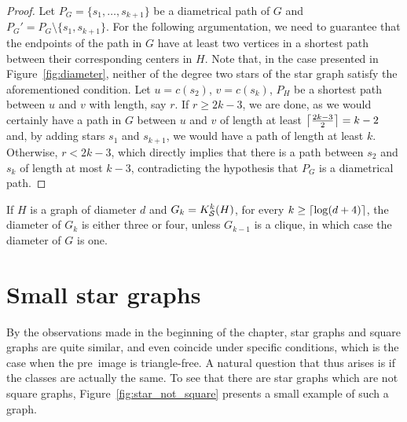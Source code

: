 \begin{proof}
    Let $P_G = \{s_1, \dots, s_{k+1}\}$ be a diametrical path of $G$ and $P_G' = P_G \setminus \{s_1, s_{k+1}\}$.
    For the following argumentation, we need to guarantee that the endpoints of the path in $G$ have at least two vertices in a shortest path between their corresponding centers in $H$.
    Note that, in the case presented in Figure~\ref{fig:diameter}, neither of the degree two stars of the star graph satisfy the aforementioned condition.
    Let $u = c(s_2)$, $v = c(s_k)$, $P_H$ be a shortest path between $u$ and $v$ with length, say $r$.
    If $r \geq 2k - 3$, we are done, as we would certainly have a path in $G$ between $u$ and $v$ of length at least $\left\lceil\frac{2k-3}{2}\right\rceil = k-2$ and, by adding stars $s_1$ and $s_{k+1}$, we would have a path of length at least $k$.
    Otherwise, $r < 2k - 3$, which directly implies that there is a path between $s_2$ and $s_k$ of length at most $k-3$, contradicting the hypothesis that $P_G$ is a diametrical path.
\end{proof}

\begin{corollary}
	If $H$ is a graph of diameter $d$ and $G_k = K_{\mathcal{S}}^k(H)$, for every $k \geq \left\lceil\log (d + 4)\right\rceil$, the diameter of $G_k$ is either three or four, unless $G_{k-1}$ is a clique, in which case the diameter of $G$ is one.
\end{corollary}

\section{Small star graphs}


By the observations made in the beginning of the chapter, star graphs and square graphs are quite similar, and even coincide under specific conditions, which is the case when the pre~image is triangle-free.
A natural question that thus arises is if the classes are actually the same.
To see that there are star graphs which are not square graphs, Figure~\ref{fig:star_not_square} presents a small example of such a graph.

